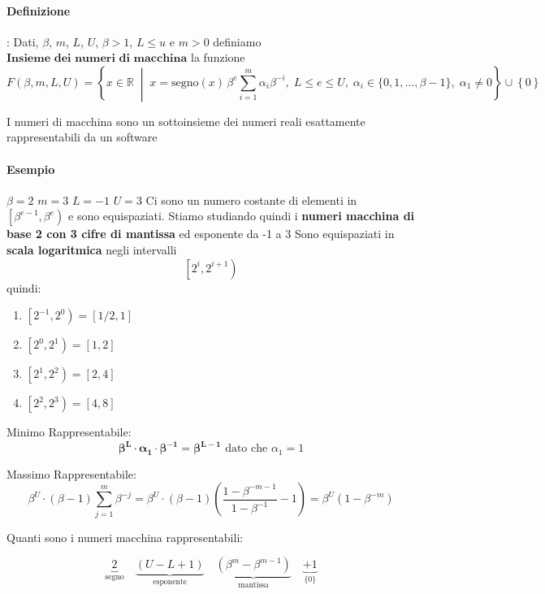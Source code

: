 \documentclass[a4paper,12pt]{article}
\begin{document}
 	\paragraph{Definizione}: Dati, $\beta$, $m$, $L$, $U$, $\beta>1$, $L \leq u$ e $m>0$ definiamo $\textbf{Insieme dei numeri di macchina}$ la funzione
		\[
		F(\beta,m,L,U) =
		\left\{
		x \in \mathbb{R}
		\;\middle|\;
		x = \mathrm{segno}(x)\,\beta^{e}
		\sum_{i=1}^{m} \alpha_i \beta^{-i},
		\;
		L \le e \le U,
		\;
		\alpha_i \in \{0,1,\dots,\beta-1\},
		\;
		\alpha_1 \neq 0
		\right\} \cup \left\{0\right\}
		\]
		
		I numeri di macchina sono un sottoinsieme dei numeri reali esattamente rappresentabili da un software 
		
		\paragraph{Esempio} $\beta = 2$ $m = 3$ $L = -1$ $U = 3$
		Ci sono un numero costante di elementi in $\left[\beta^{e-1}, \beta^{e}\right)$ e sono equispaziati.\newline
		Stiamo studiando quindi i \textbf{numeri macchina di base 2 con 3 cifre di mantissa} ed esponente da -1 a 3 \newline
		Sono equispaziati in \textbf{scala logaritmica} negli intervalli
		\begin{equation*}
			\left[2^{i}, 2^{i+1}\right)
		\end{equation*}
		quindi:
		\begin{enumerate}
			\item $\left[2^{-1}, 2^{0}\right) =  \left[1/2, 1\right]$
			\item $\left[2^{0}, 2^{1}\right) =  \left[1, 2\right]$
			\item $\left[2^{1}, 2^{2}\right) =  \left[2, 4\right]$
			\item $\left[2^{2}, 2^{3}\right) =  \left[4, 8\right]$
		\end{enumerate}
		\begin{tcolorbox} [title=Osservazione]
			Minimo Rappresentabile:
			\begin{equation*}
				\mathbf{\beta^{L} \cdot \alpha_1 \cdot \beta^{-1} = \beta^{L-1}} \text{ dato che } \alpha_1 = 1
			\end{equation*}
			
			Massimo Rappresentabile:
			\begin{equation*}
				\beta^{U}\cdot\left(\beta-1\right)\sum_{j=1}^{m}\beta^{-j} = \beta^{U}\cdot\left(\beta-1\right)\left(\frac{1-\beta^{-m-1}}{1-\beta^{-1}}-1\right)
				= \beta^{U}\left(1-\beta^{-m}\right)
			\end{equation*}
			
			Quanti sono i numeri macchina rappresentabili:
			
			\[
			\underbrace{2}_{\text{segno}}
			\quad
			\underbrace{(U - L + 1)}_{\text{esponente}}
			\quad
			\underbrace{\left(\beta^{m} - \beta^{m-1}\right)}_{\text{mantissa}}
			\quad
			\underbrace{+1}_{\{0\}}
			\]
		\end{tcolorbox}
		
\end{document}

